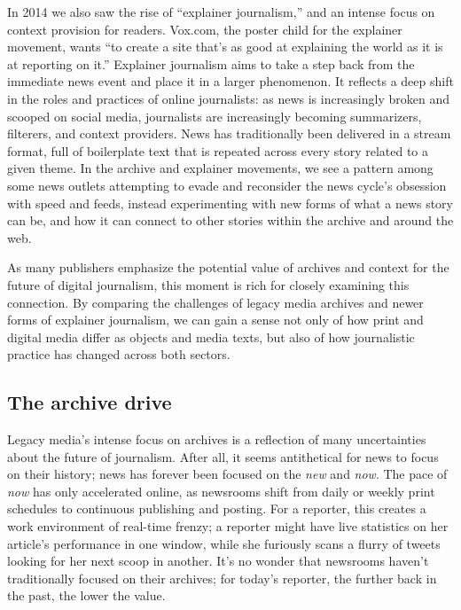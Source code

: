 In 2014 we also saw the rise of ``explainer journalism,'' and an intense focus on context provision for readers. Vox.com, the poster child for the explainer movement, wants ``to create a site that's as good at explaining the world as it is at reporting on it.''\autocite{klein_vox_2014} Explainer journalism aims to take a step back from the immediate news event and place it in a larger phenomenon. It reflects a deep shift in the roles and practices of online journalists: as news is increasingly broken and scooped on social media, journalists are increasingly becoming summarizers, filterers, and context providers. News has traditionally been delivered in a stream format, full of boilerplate text that is repeated across every story related to a given theme. In the archive and explainer movements, we see a pattern among some news outlets attempting to evade and reconsider the news cycle's obsession with speed and feeds, instead experimenting with new forms of what a news story can be, and how it can connect to other stories within the archive and around the web.

As many publishers emphasize the potential value of archives and context for the future of digital journalism, this moment is rich for closely examining this connection. By comparing the challenges of legacy media archives and newer forms of explainer journalism, we can gain a sense not only of how print and digital media differ as objects and media texts, but also of how journalistic practice has changed across both sectors.

\subsection{The archive drive}

Legacy media's intense focus on archives is a reflection of many uncertainties about the future of journalism. After all, it seems antithetical for news to focus on their history; news has forever been focused on the \emph{new} and \emph{now}. The pace of \emph{now} has only accelerated online, as newsrooms shift from daily or weekly print schedules to continuous publishing and posting. For a reporter, this creates a work environment of real-time frenzy; a reporter might have live statistics on her article's performance in one window, while she furiously scans a flurry of tweets looking for her next scoop in another. It's no wonder that newsrooms haven't traditionally focused on their archives; for today's reporter, the further back in the past, the lower the value.


